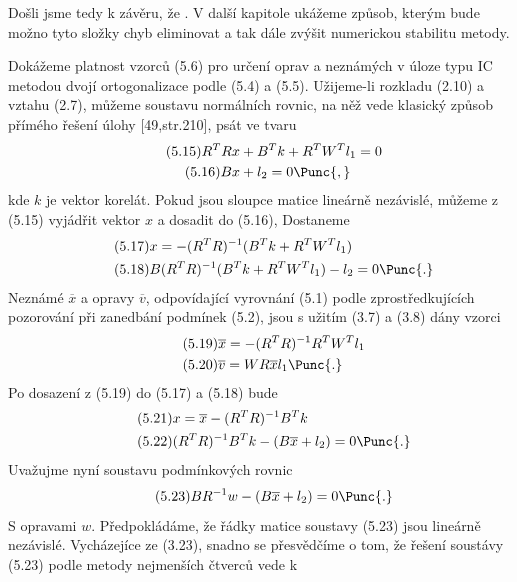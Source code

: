Došli jsme tedy k závěru, že . V další kapitole ukážeme způsob, kterým bude možno
tyto složky chyb eliminovat a tak dále zvýšit numerickou stabilitu
metody.


 \label{XLVI} Dokážeme platnost vzorců (5.6) pro určení oprav
a neznámých v úloze typu IC metodou dvojí ortogonalizace podle
(5.4) a (5.5). Užijeme-li rozkladu (2.10) a vztahu (2.7),
můžeme soustavu normálních rovnic, na něž vede klasický způsob
přímého řešení úlohy [49,str.210], psát ve tvaru
%
\begin{align*}
\tag{5.15}      R^TRx& + B^Tk + R^TW^Tl_1 = 0\\
\tag{5.16}      Bx&           + l_2      = 0 \Punc{,}
\end{align*}
%
kde $k$ je vektor korelát. Pokud jsou sloupce matice \Amat{} lineárně
nezávislé, můžeme z (5.15) vyjádřit vektor $x$ a dosadit do (5.16),
Dostaneme
%
\begin{align*}
\tag{5.17}     &x = -(R^TR)^{-1}(B^Tk + R^TW^Tl_1)\\
\tag{5.18}     &B(R^TR)^{-1} (B^Tk + R^TW^Tl_1) - l_2 = 0 \Punc{.}
\end{align*}
%
Neznámé $\overline{x}$ a opravy $\overline{v}$, odpovídající vyrovnání
(5.1) podle zprostředkujících pozorování při zanedbání podmínek
(5.2), jsou s užitím (3.7) a (3.8) dány vzorci
%
\begin{align*}
\tag{5.19}      &\overline{x} = -(R^TR)^{-1}R^TW^Tl_1\\
\tag{5.20}      &\overline{v} = WR\overline{x}l_1 \Punc{.}
\end{align*}
%
Po dosazení  z (5.19) do (5.17) a (5.18) bude
\begin{align*}
\tag{5.21}     &x = \overline{x} - (R^TR)^{-1}B^Tk\\
\tag{5.22}     &(R^TR)^{-1}B^Tk - (B\overline{x} + l_2) = 0 \Punc{.}
\end{align*}
%
Uvažujme nyní soustavu podmínkových rovnic
%
\begin{align*}
\tag{5.23}     BR^{-1}w - (B\overline{x} + l_2) = 0 \Punc{.}
\end{align*}
%
S opravami $w$. Předpokládáme, že řádky matice soustavy (5.23) jsou
lineárně nezávislé. Vycházejíce ze (3.23), snadno se přesvědčíme o
tom, že řešení soustávy (5.23) podle metody nejmenších čtverců vede k
